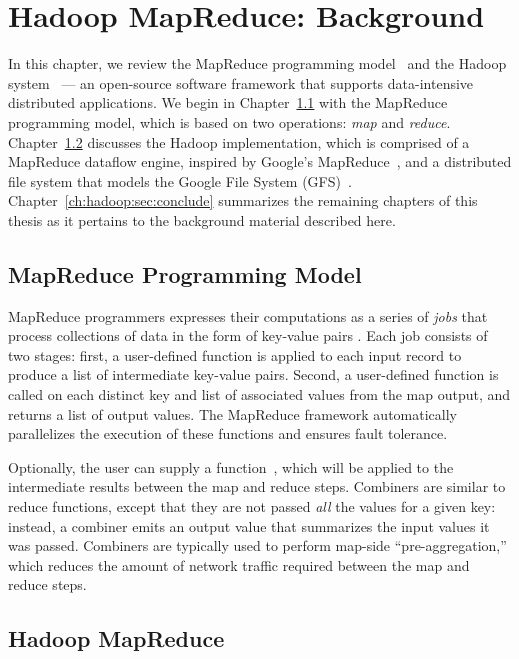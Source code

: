 \chapter[Hadoop MapReduce: Background]{Hadoop MapReduce: Background}
\label{ch:hadoop}

In this chapter, we review the MapReduce programming
model~\cite{mapreduce-osdi} and the Hadoop system~\cite{hadoop} --- an
open-source software framework that supports data-intensive distributed
applications.  We begin in Chapter~\ref{ch:hadoop:sec:progmodel} with the
MapReduce programming model, which is based on two operations: {\em map} and
{\em reduce}.  Chapter~\ref{ch:hadoop:sec:hadoop} discusses the Hadoop
implementation, which is comprised of a MapReduce dataflow engine, inspired by
Google's MapReduce~\cite{mapreduce-osdi}, and a distributed file system that
models the Google File System (GFS)~\cite{gfs-sosp}.
Chapter~\ref{ch:hadoop:sec:conclude} summarizes the remaining chapters of this
thesis as it pertains to the background material described here.

\section{MapReduce Programming Model}
\label{ch:hadoop:sec:progmodel}

MapReduce programmers expresses their computations as a series of {\em jobs}
that process collections of data in the form of key-value pairs . Each job
consists of two stages: first, a user-defined  function is applied to
each input record to produce a list of intermediate key-value pairs.  Second, a
user-defined  function is called on each distinct key and
list of associated values from the map output, and returns a list of output
values.  The MapReduce framework automatically parallelizes the execution of
these functions and ensures fault tolerance.

Optionally, the user can supply a 
function~\cite{mapreduce-osdi}, which will be applied to the intermediate
results between the map and reduce steps.  Combiners are similar to reduce
functions, except that they are not passed {\em all} the values for a given
key: instead, a combiner emits an output value that summarizes the input values
it was passed.  Combiners are typically used to perform map-side
``pre-aggregation,'' which reduces the amount of network traffic required
between the map and reduce steps.

\section{Hadoop MapReduce}
\label{ch:hadoop:sec:hadoop}

